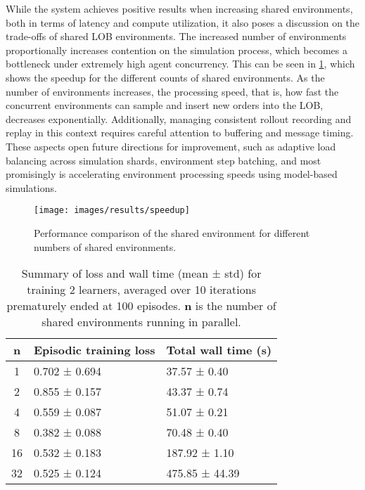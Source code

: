 While the system achieves positive results when increasing shared environments, both in terms of latency and compute utilization,
it also poses a discussion on the trade-offs of shared LOB environments.
The increased number of environments proportionally increases contention on the simulation process, which becomes a bottleneck under extremely high agent concurrency.
This can be seen in \cref{fig:speedup}, which shows the speedup for the different counts of shared environments.
As the number of environments increases, the processing speed, that is, how fast the concurrent environments can sample and insert new orders into the LOB,
decreases exponentially.
Additionally, managing consistent rollout recording and replay in this context requires careful attention to buffering and message timing.
These aspects open future directions for improvement, such as adaptive load balancing across simulation shards, environment step batching,
and most promisingly is accelerating environment processing speeds using model-based simulations.

\begin{figure}
    \centering
    \texttt{[image: images/results/speedup]}
    \caption{Performance comparison of the shared environment for different numbers of shared environments.}
    \label{fig:speedup}
\end{figure}

\begin{table}[h!]
    \centering
    \renewcommand{\arraystretch}{1.2}
    \begin{tabularx}{\textwidth}{|c|X|X|}
        \hline
        \textbf{n} & \textbf{Episodic training loss} & \textbf{Total wall time (s)} \\
        \hline
        1          & 0.702 ± 0.694                 & 37.57 ± 0.40             \\
        2          & 0.855 ± 0.157                 & 43.37 ± 0.74             \\
        4          & 0.559 ± 0.087                 & 51.07 ± 0.21             \\
        8          & 0.382 ± 0.088                 & 70.48 ± 0.40             \\
        16         & 0.532 ± 0.183                 & 187.92 ± 1.10            \\
        32         & 0.525 ± 0.124                 & 475.85 ± 44.39           \\
        \hline
    \end{tabularx}
    \caption{
        Summary of loss and wall time (mean ± std) for training $2$ learners, averaged over 10 iterations prematurely ended at 100 episodes.
        $\textbf{n}$ is the number of shared environments running in parallel.
    }
    \label{tab:summary}
\end{table}


